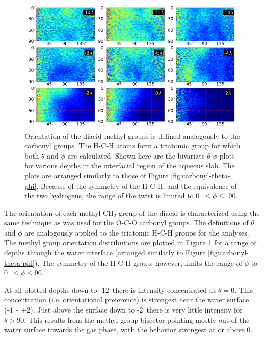 \begin{figure}[h!]
	\begin{center}
		\includegraphics[scale=1.0]{images/bond-angles/methyl-theta-phi.png}
		\caption{Orientation of the diacid methyl groups is defined analogously to the carbonyl groups. The H-C-H atoms form a triatomic group for which both $\theta$ and $\phi$ are calculated. Shown here are the bivariate $\theta$-$\phi$ plots for various depths in the interfacial region of the aqueous slab. The plots are arranged similarly to those of Figure \ref{fig:carbonyl-theta-phi}. Because of the symmetry of the H-C-H, and the equivalence of the two hydrogens, the range of the twist is limited to 0\textdegree~$\leq \phi \leq$ 90\textdegree.}
		\label{fig:methyl-theta-phi}
	\end{center}
\end{figure}

The orientation of each methyl CH$_2$ group of the diacid is characterized using the same technique as was used for the O-C-O carbonyl groups. The definitions of $\theta$ and $\phi$ are analogously applied to the triatomic H-C-H groups for the analyses. The methyl group orientation distributions are plotted in Figure \ref{fig:methyl-theta-phi} for a range of depths through the water interface (arranged similarly to Figure \ref{fig:carbonyl-theta-phi}). The symmetry of the H-C-H group, however, limits the range of $\phi$ to 0\textdegree~$\leq \phi \leq 90$\textdegree.

At all plotted depths down to -12\angs~there is intensity concentrated at $\theta=0$\textdegree. This concentration (i.e. orientational preference) is strongest near the water surface (-4\angs~- +2\angs). Just above the surface down to -2\angs~there is very little intensity for $\theta >90$\textdegree. This results from the methyl group bisector pointing mostly out of the water surface towards the gas phase, with the behavior strongest at or above 0\angs.

